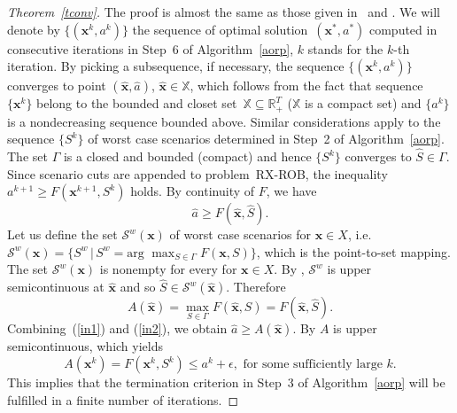 \documentclass[11pt]{article}
\newcommand{\Rset}{\mathbb{R}}
\newcommand{\Xset}{\mathbb{X}}
\begin{document}
\begin{proof}[Theorem~\ref{tconv}]
The proof is almost the same as those given in~\cite[Theorem~2.5]{G72} and \cite[Theorem~3]{SA80}.
We will denote by $\{(\pmb{x}^{k},a^{k})\}$ the sequence of optimal solution~$(\pmb{x}^{*},a^{*})$
computed in consecutive  iterations in Step~6 of Algorithm~\ref{aorp},
 $k$ stands for the  $k$-th iteration.
 By picking a subsequence, if necessary, the sequence $\{(\pmb{x}^{k},a^{k})\}$
converges to point $(\hat{\pmb{x}},\hat{a})$, $\hat{\pmb{x}}\in \Xset$, which 
follows from the fact that sequence~$\{\pmb{x}^{k}\}$ belong to the bounded and closet
 set~$\Xset \subseteq \Rset^{T}_{+}$ ($\Xset$ is a compact set) and
$\{a^{k}\}$ is a nondecreasing sequence bounded above. Similar considerations apply to the 
sequence $\{S^k\}$ of worst case scenarios determined in Step~2 of Algorithm~\ref{aorp}.
 The set $\Gamma$ is
a closed and bounded (compact) and hence  $\{S^k\}$  converges to $\hat{S}\in \Gamma$.
Since scenario cuts are appended to  problem~\textsc{RX-ROB}, the inequality 
$a^{k+1}\geq F(\pmb{x}^{k+1},S^{k})$ holds. By continuity of $F$,
we have
\begin{equation}
\hat{a}\geq F(\hat{\pmb{x}},\hat{S}).
\label{in1}
\end{equation}
Let us define the set $\mathcal{S}^{w}(\pmb{x})$ of worst case scenarios for $\pmb{x}\in X$, i.e.
$\mathcal{S}^{w}(\pmb{x})=\{S^{w}\,|\,S^{w}=\text{arg }\max_{S\in \Gamma}F(\pmb{x},S)\}$, which is
the point-to-set mapping. The set $\mathcal{S}^{w}(\pmb{x})$ is nonempty for every for $\pmb{x}\in X$.
By \cite[Theorem~1.5]{M70}, $\mathcal{S}^{w}$ is upper semicontinuous at $\hat{\pmb{x}}$
and so $\hat{S}\in \mathcal{S}^{w}(\hat{\pmb{x}})$. Therefore 
\begin{equation}
   A(\hat{\pmb{x}})=\max_{S\in \Gamma} F(\hat{\pmb{x}},S)=F(\hat{\pmb{x}},\hat{S}).
   \label{in2}
\end{equation}
Combining~(\ref{in1}) and (\ref{in2}), we obtain $\hat{a}\geq A(\hat{\pmb{x}})$.
By \cite[Lemma~1.2]{M70} $A$ is upper semicontinuous, which  yields
\[
A(\pmb{x}^{k})= F(\pmb{x}^{k},S^{k}) \leq a^{k}+\epsilon, \text{ for some sufficiently large } k.
\]
This implies that the termination criterion in Step~3 of Algorithm~\ref{aorp} will be  fulfilled in a finite number of iterations.
\end{proof}
\end{document}
